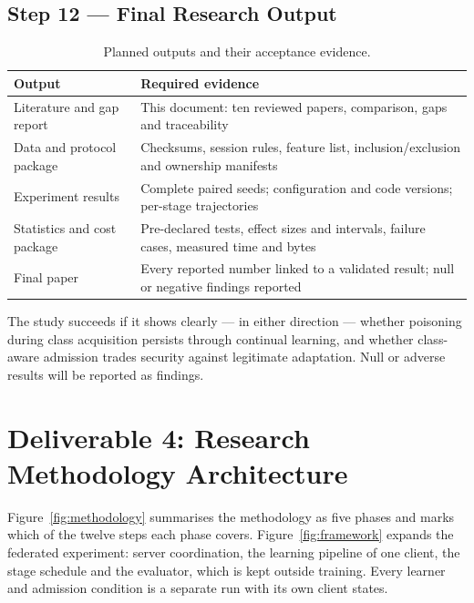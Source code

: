 \documentclass[10pt,a4paper]{article}
\begin{document}
\subsection{Step 12 --- Final Research Output}
\begin{table}[htbp]
\centering\footnotesize
\caption{Planned outputs and their acceptance evidence.}
\label{tab:artifacts}
\begin{tabularx}{\linewidth}{L{3.4cm}Y}
\toprule
Output & Required evidence\\
\midrule
Literature and gap report & This document: ten reviewed papers, comparison, gaps and traceability\\
Data and protocol package & Checksums, session rules, feature list, inclusion/exclusion and ownership manifests\\
Experiment results & Complete paired seeds; configuration and code versions; per-stage trajectories\\
Statistics and cost package & Pre-declared tests, effect sizes and intervals, failure cases, measured time and bytes\\
Final paper & Every reported number linked to a validated result; null or negative findings reported\\
\bottomrule
\end{tabularx}
\end{table}
The study succeeds if it shows clearly --- in either direction --- whether poisoning during class acquisition persists through continual learning, and whether class-aware admission trades security against legitimate adaptation. Null or adverse results will be reported as findings.

\section{Deliverable 4: Research Methodology Architecture}
Figure~\ref{fig:methodology} summarises the methodology as five phases and marks which of the twelve steps each phase covers. Figure~\ref{fig:framework} expands the federated experiment: server coordination, the learning pipeline of one client, the stage schedule and the evaluator, which is kept outside training. Every learner and admission condition is a separate run with its own client states.
\end{document}
